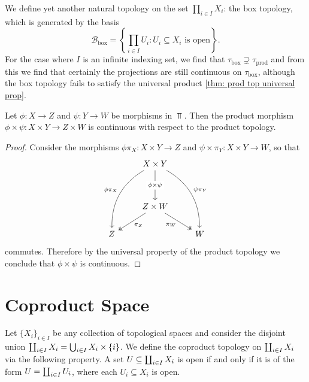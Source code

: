 \begin{definition}
    We define yet another natural topology on the set \(\prod_{i \in I} X_i\): the
    box topology, which is generated by the basis
    \[
        \mathcal B_\text{box} = \left\{\prod_{i \in I} U_i \colon U_i \subseteq X_i
        \text{ is open}\right\}.
    \]
    For the case where \(I\) is an infinite indexing set, we find that
    \(\tau_\text{box} \supsetneq \tau_\text{prod}\) and from this we find that
    certainly the projections are still continuous on \(\tau_\text{box}\),
    although the box topology fails to satisfy the universal product \cref{thm:
        prod top universal prop}.
\end{definition}

\begin{proposition}
    \label{prop:product-of-continuous-maps-is-continuous}
    Let \(\phi: X \to Z\) and \(\psi: Y \to W\) be morphisms in \(\Top\). Then the
    product morphism \(\phi \times \psi: X \times Y \to Z \times W\) is continuous
    with respect to the product topology.
\end{proposition}

\begin{proof}
    Consider the morphisms \(\phi \pi_X: X \times Y \to Z\) and
    \(\psi \times \pi_Y: X \times Y \to W\), so that
    \[
        \begin{tikzcd}
            &X \times Y \ar[dd, "\phi \times \psi" description]
            \ar[ddld, "\phi \pi_X", bend right, swap]
            \ar[ddrd, "\psi \pi_Y", bend left]
            & \\
            &&
            \\
            &Z \times W
            \ar[rd, "\pi_W"', two heads]
            \ar[ld, "\pi_Z", two heads]
            & \\
            Z & &W
        \end{tikzcd}
    \]
    commutes. Therefore by the universal property of the product topology we
    conclude that \(\phi \times \psi\) is continuous.
\end{proof}

\section{Coproduct Space}

\begin{definition}
    Let \(\{X_i\}_{i \in I}\) be any collection of topological spaces and consider
    the disjoint union \(\coprod_{i \in I} X_i = \bigcup_{i \in  I} X_i \times
    \{i\}\). We define the coproduct topology on \(\coprod_{i \in I} X_i\) via the
    following property. A set \(U \subseteq \coprod_{i \in I} X_i\) is open if and
    only if it is of the form \(U = \coprod_{i \in I} U_i\), where each \(U_i
    \subseteq X_i\) is open.
\end{definition}

